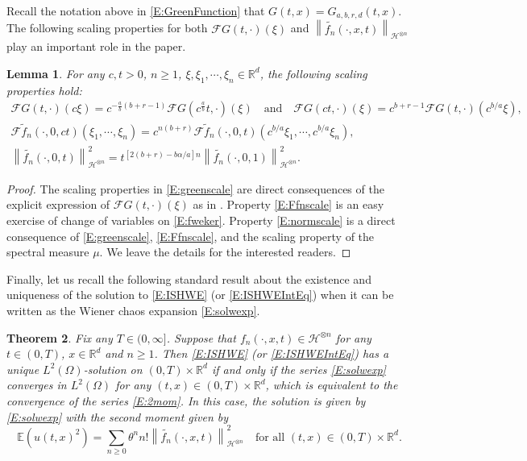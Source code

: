 \documentclass[12pt]{report}
\theoremstyle{plain}
\newtheorem{theorem}{Theorem}[section]
\newtheorem{lemma}[theorem]{Lemma}
\theoremstyle{definition}
\numberwithin{equation}{section}
\newcommand{\R}{\mathbb{R}}
\newcommand{\Norm}[1]{\left\|  #1   \right\|}
\begin{document}
Recall the notation above in \eqref{E:GreenFunction} that $G(t,x) = G_{a,b,r,d}(t,x)$. The following
scaling properties for both $\mathcal{F}G(t,\cdot)(\xi)$ and
$\Norm{\widetilde{f_n}(\cdot,x,t)}_{\mathcal{H}^{\otimes n}}$ play an important role in the paper.

\begin{lemma} \label{L:Scale}
	For any $c,t>0$, $n\ge 1$, $\xi,\xi_1,\cdots,\xi_n\in\R^d$, the following scaling properties hold:
	\begin{gather} \label{E:greenscale}
	\mathcal{F}G(t,\cdot)(c\xi) = c^{-\frac{a}{b}(b+r
		-1)}\mathcal{F}G\left(c^{\frac{a}{b}}t,\cdot\right)( \xi) \quad \text{and} \quad
	\mathcal{F}G(ct,\cdot)(\xi) = c^{b+r -1}\mathcal{F}G(t,\cdot)(c^{b/a} \xi), \\
	\label{E:Ffnscale} \mathcal{F}\widetilde{f}_n(\cdot,0,ct)(\xi_1,\cdots,\xi_n) = c^{n(b+r)}
	\mathcal{F}\widetilde{f}_n(\cdot,0,t)(c^{b/a}\xi_1, \cdots, c^{b/a}\xi_n), \\
	\label{E:normscale} \Norm{\widetilde{f_n}(\cdot,0,t)}_{\mathcal{H}^{\otimes n}}^2 = t^{[2(b + r
		) -b \alpha / a]n} \Norm{\widetilde{f_n}(\cdot,0,1)}_{\mathcal{H}^{\otimes n}}^2.
	\end{gather}
\end{lemma}
\begin{proof}
	The scaling properties in \eqref{E:greenscale} are direct consequences of the explicit expression
	of $\mathcal{F}G(t,\cdot)(\xi)$ as in \cite[(4.8)]{chen.hu.nualart:19:spacetimefrac}. Property \eqref{E:Ffnscale} is an easy
	exercise of change of variables on \eqref{E:fweker}. Property \eqref{E:normscale} is a direct
	consequence of \eqref{E:greenscale}, \eqref{E:Ffnscale}, and the scaling property of the spectral
	measure $\mu$. We leave the details for the interested readers.
\end{proof}

Finally, let us recall the following standard result about the existence and uniqueness of the
solution to \eqref{E:ISHWE} (or \eqref{E:ISHWEIntEq}) when it can be written as the Wiener chaos expansion
\eqref{E:solwexp}.

\begin{theorem}\label{T:2momseries}
	Fix any $T \in (0,\infty]$. Suppose that $f_n(\cdot,x,t) \in \mathcal{H}^{\otimes n}$ for any $t
	\in (0,T)$, $x \in \R^d$ and $n \ge 1$. Then \eqref{E:ISHWE} (or \eqref{E:ISHWEIntEq}) has a unique
	$L^2(\Omega)$-solution on $(0,T) \times \R^d$ if and only if the series \eqref{E:solwexp}
	converges in $L^2(\Omega)$ for any $(t,x) \in (0,T) \times \R^d$, which is equivalent to the
	convergence of the series \eqref{E:2mom}. In this case, the solution is given by \eqref{E:solwexp}
	with the second moment given by
	\begin{equation} \label{E:2mom}
	\mathbb{E}\left(u(t,x)^2\right)
	= \sum_{n \ge 0} \theta^n n!  \Norm{\widetilde{f_n}(\cdot,x,t)}_{\mathcal{H}^{\otimes n}}^2
	\quad \text{for all $(t,x) \in (0,T) \times \R^d$}.
	\end{equation}
\end{theorem}
\end{document}
